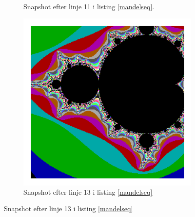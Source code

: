 \begin{figure}
\begin{subfigure}[b]{0.3\textwidth}
        \caption{ Snapshot efter linje 11 i listing \ref{mandelseq}. }
    \end{subfigure}
    \begin{subfigure}[b]{0.3\textwidth}
        \centering
        \includegraphics[width=\textwidth]{pictures/M6.png}
        \caption{ Snapshot efter linje 13 i listing \ref{mandelseq}}
    \end{subfigure}


\end{figure}
